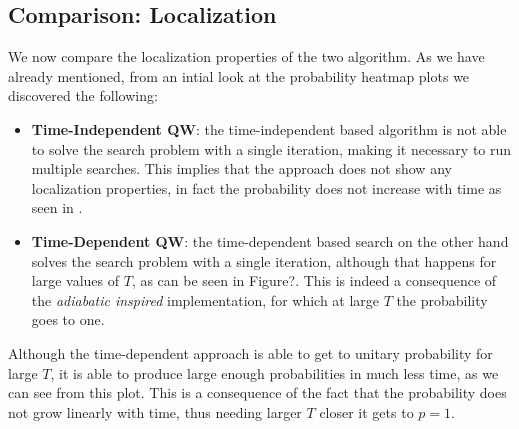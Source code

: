     \clearpage
    \subsection{Comparison: Localization}\label{subsec:localization_results}
        We now compare the localization properties of the two algorithm. As we have already mentioned, from an intial look at the probability heatmap plots we discovered the following:
        \begin{itemize}
            \item \textbf{Time-Independent QW}: the time-independent based algorithm is not able to solve the search problem with a single iteration, making it necessary to run multiple searches. This implies that the approach does not show any localization properties, in fact the probability does not increase with time as seen in .
            \item \textbf{Time-Dependent QW}: the time-dependent based search on the other hand solves the search problem with a single iteration, although that happens for large values of $T$, as can be seen in Figure?. This is indeed a consequence of the \textit{adiabatic inspired} implementation, for which at large $T$ the probability goes to one.
        \end{itemize}
        

        \clearpage
        \noindent
        Although the time-dependent approach is able to get to unitary probability for large $T$, it is able to produce large enough probabilities in much less time, as we can see from this plot. This is a consequence of the fact that the probability does not grow linearly with time, thus needing larger $T$ closer it gets to $p=1$. 
        

        \clearpage
